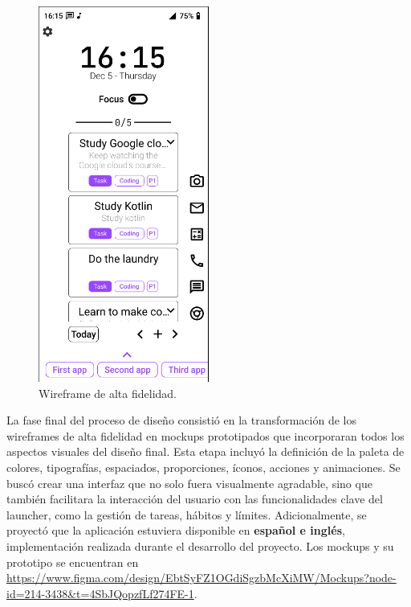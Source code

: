 \begin{figure}[H]
  \caption{Wireframe de alta fidelidad.}
  \label{fig:wireframe_alta_fidelidad}
  \includegraphics[width=0.5\textwidth]{Figuras/wireframe_alta_fidelidad.png}
  \centering
\end{figure}

La fase final del proceso de diseño consistió en la transformación de los wireframes de alta fidelidad en mockups prototipados que incorporaran todos los aspectos visuales del diseño final. Esta etapa incluyó la definición de la paleta de colores, tipografías, espaciados, proporciones, íconos, acciones y animaciones. Se buscó crear una interfaz que no solo fuera visualmente agradable, sino que también facilitara la interacción del usuario con las funcionalidades clave del launcher, como la gestión de tareas, hábitos y límites. Adicionalmente, se proyectó que la aplicación estuviera disponible en \textbf{español e inglés}, implementación realizada durante el desarrollo del proyecto. Los mockups y su prototipo se encuentran en \url{https://www.figma.com/design/EbtSyFZ1OGdiSgzbMcXiMW/Mockups?node-id=214-3438&t=4SbJQopzfLf274FE-1}.

